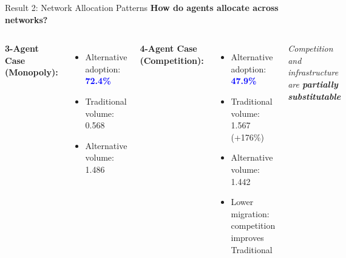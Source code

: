 \documentclass[aspectratio=169]{beamer}
\begin{document}
\begin{frame}{Result 2: Network Allocation Patterns}
    \textbf{How do agents allocate across networks?}
    
    \vspace{0.3cm}
    \begin{columns}
        \textbf{3-Agent Case (Monopoly):}
        \begin{itemize}
            \item Alternative adoption: \textcolor{blue}{\textbf{72.4\%}}
            \item Traditional volume: 0.568
            \item Alternative volume: 1.486
        \end{itemize}
        
        \vspace{0.3cm}
        \textbf{4-Agent Case (Competition):}
        \begin{itemize}
            \item Alternative adoption: \textcolor{blue}{\textbf{47.9\%}}
            \item Traditional volume: 1.567 (+176\%)
            \item Alternative volume: 1.442
            \item Lower migration: competition improves Traditional
        \end{itemize}
        
        \centering
        
        \vspace{0.3cm}
        \small{\textit{Competition and infrastructure are \textbf{partially substitutable}}}
    \end{columns}
\end{frame}
\end{document}
